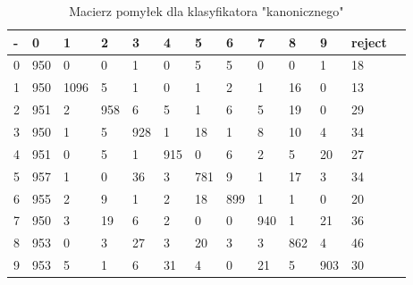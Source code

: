\documentclass[a4paper]{article}
\begin{document}
\begin{table}[H]
    \caption{Macierz pomyłek dla klasyfikatora "kanonicznego"
    \label{table:confusion}
    }
\begin{center}
    \begin{tabular}{| l | l | l | l | l | l | l | l | l | l | l | l | l |}
    \hline
        - & 0 & 1 & 2 & 3 & 4 & 5 & 6 & 7 & 8 & 9 & reject\\
    \hline
        0 &  950  &   0   &  0  &   1  &   0  &   5  &   5 &    0  &   0 &    1   & 18 \\
        1 &  950  &1096   &  5  &   1  &   0  &   1  &   2 &    1  &  16 &    0   & 13 \\
        2 &  951  &   2   &958  &   6  &   5  &   1  &   6 &    5  &  19 &    0   & 29 \\
        3 &  950  &   1   &  5  & 928  &   1  &  18  &   1 &    8  &  10 &    4   & 34 \\
        4 &  951  &   0   &  5  &   1  & 915  &   0  &   6 &    2  &   5 &   20   & 27 \\
        5 &  957  &   1   &  0  &  36  &   3  & 781  &   9 &    1  &  17 &    3   & 34 \\
        6 &  955  &   2   &  9  &   1  &   2  &  18  & 899 &    1  &   1 &    0   & 20 \\
        7 &  950  &   3   & 19  &   6  &   2  &   0  &   0 &  940  &   1 &   21   & 36 \\
        8 &  953  &   0   &  3  &  27  &   3  &  20  &   3 &    3  & 862 &    4   & 46 \\
        9 &  953  &   5   &  1  &   6  &  31  &   4  &   0 &   21  &   5 &  903   & 30 \\
    \hline
    \end{tabular}
\end{center}
\end{table}
\end{document}
